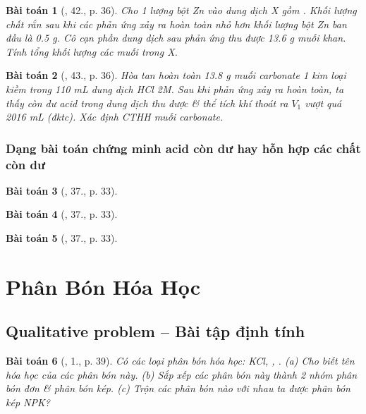 \documentclass{article}
\newtheorem{baitoan}{Bài toán}
\begin{document}
\begin{baitoan}[\cite{An_350_BT_Hoa_Hoc_9}, 42., p. 36]
	Cho 1 lượng bột \emph{Zn} vào dung dịch X gồm \emph{}. Khối lượng chất rắn sau khi các phản ứng xảy ra hoàn toàn nhỏ hơn khối lượng bột \emph{Zn} ban đầu là \emph{0.5 g}. Cô cạn phần dung dịch sau phản ứng thu được \emph{13.6 g} muối khan. Tính tổng khối lượng các muối trong X.
\end{baitoan}

\begin{baitoan}[\cite{An_350_BT_Hoa_Hoc_9}, 43., p. 36]
	Hòa tan hoàn toàn \emph{13.8 g} muối carbonate 1 kim loại kiềm \emph{} trong \emph{110 mL} dung dịch \emph{HCl 2M}. Sau khi phản ứng xảy ra hoàn toàn, ta thấy còn dư acid trong dung dịch thu được \& thể tích khí thoát ra $V_1$ vượt quá \emph{2016 mL} (đktc). Xác định CTHH muối carbonate.
\end{baitoan}

\subsubsection{Dạng bài toán chứng minh acid còn dư hay hỗn hợp các chất còn dư}

\begin{baitoan}[\cite{An_350_BT_Hoa_Hoc_9}, 37., p. 33]
	
\end{baitoan}

\begin{baitoan}[\cite{An_350_BT_Hoa_Hoc_9}, 37., p. 33]
	
\end{baitoan}

\begin{baitoan}[\cite{An_350_BT_Hoa_Hoc_9}, 37., p. 33]
	
\end{baitoan}


\section{Phân Bón Hóa Học}

\subsection{Qualitative problem -- Bài tập định tính}

\begin{baitoan}[\cite{SGK_Hoa_Hoc_9}, 1., p. 39]
	Có các loại phân bón hóa học: \emph{KCl, , }. (a) Cho biết tên hóa học của các phân bón này. (b) Sắp xếp các phân bón này thành 2 nhóm phân bón đơn \& phân bón kép. (c) Trộn các phân bón nào với nhau ta được phân bón kép NPK?
\end{baitoan}
\end{document}
